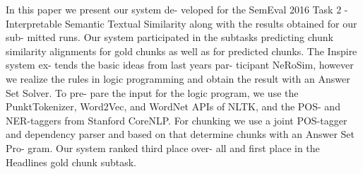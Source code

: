 In this paper we present our system de- veloped for the SemEval 2016 Task 2 - Interpretable Semantic Textual Similarity along with the results obtained for our sub- mitted runs. Our system participated in the subtasks predicting chunk similarity alignments for gold chunks as well as for predicted chunks. The Inspire system ex- tends the basic ideas from last years par- ticipant NeRoSim, however we realize the rules in logic programming and obtain the result with an Answer Set Solver. To pre- pare the input for the logic program, we use the PunktTokenizer, Word2Vec, and WordNet APIs of NLTK, and the POS- and NER-taggers from Stanford CoreNLP. For chunking we use a joint POS-tagger and dependency parser and based on that determine chunks with an Answer Set Pro- gram. Our system ranked third place over- all and first place in the Headlines gold chunk subtask.
